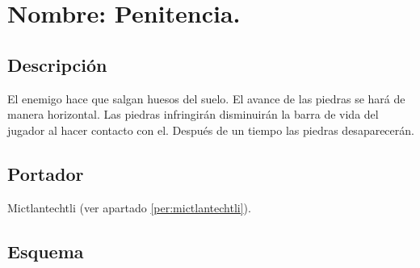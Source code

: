 \section{Nombre: Penitencia.}\label{hab.Penitencia}
\subsection{Descripción}
El enemigo hace que salgan huesos del suelo. El avance de las piedras se hará de manera horizontal. Las piedras infringirán disminuirán la barra de vida del jugador al hacer contacto con el. Después de un tiempo las piedras desaparecerán.
\subsection{Portador}
Mictlantechtli (ver apartado \ref{per:mictlantechtli}).	
\subsection{Esquema}
			